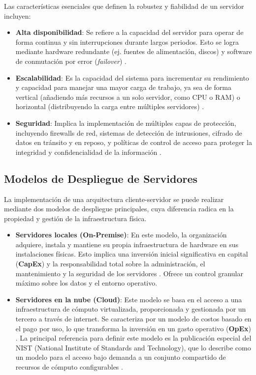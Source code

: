 Las características esenciales que definen la robustez y fiabilidad de un servidor incluyen:

\begin{itemize}
    \item \textbf{Alta disponibilidad}: Se refiere a la capacidad del servidor para operar de forma continua y sin interrupciones durante largos periodos. Esto se logra mediante hardware redundante (ej. fuentes de alimentación, discos) y software de conmutación por error (\textit{failover}) \cite{Stanek2014}.
    \item \textbf{Escalabilidad}: Es la capacidad del sistema para incrementar su rendimiento y capacidad para manejar una mayor carga de trabajo, ya sea de forma vertical (añadiendo más recursos a un solo servidor, como CPU o RAM) o horizontal (distribuyendo la carga entre múltiples servidores) \cite{Mancera2015}.
    \item \textbf{Seguridad}: Implica la implementación de múltiples capas de protección, incluyendo firewalls de red, sistemas de detección de intrusiones, cifrado de datos en tránsito y en reposo, y políticas de control de acceso para proteger la integridad y confidencialidad de la información \cite{Espana2003}.
\end{itemize}

\subsection{Modelos de Despliegue de Servidores}
\label{subsec:modelos_despliegue}

La implementación de una arquitectura cliente-servidor se puede realizar mediante dos modelos de despliegue principales, cuya diferencia radica en la propiedad y gestión de la infraestructura física.

\begin{itemize}
    \item \textbf{Servidores locales (On-Premise)}: En este modelo, la organización adquiere, instala y mantiene su propia infraestructura de hardware en sus instalaciones físicas. Esto implica una inversión inicial significativa en capital (\textbf{CapEx}) y la responsabilidad total sobre la administración, el mantenimiento y la seguridad de los servidores \cite{Mullins2012}. Ofrece un control granular máximo sobre los datos y el entorno operativo.

    \item \textbf{Servidores en la nube (Cloud)}: Este modelo se basa en el acceso a una infraestructura de cómputo virtualizada, proporcionada y gestionada por un tercero a través de internet. Se caracteriza por un modelo de costos basado en el pago por uso, lo que transforma la inversión en un gasto operativo (\textbf{OpEx}) \cite{softteco2024}. La principal referencia para definir este modelo es la publicación especial del NIST (National Institute of Standards and Technology), que lo describe como un modelo para el acceso bajo demanda a un conjunto compartido de recursos de cómputo configurables \cite{mell2011nist}.
\end{itemize}

